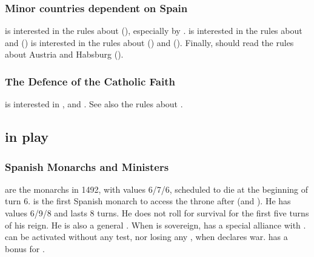 \subsubsection{Minor countries dependent on Spain}
\aparag[Knights] \SPA is interested in the rules about 
(), especially by .
 \SPA is interested in the rules about
 and  ()
\aparag[Burgundy] \SPA is interested in the rules about 
() and  ().
\aparag[Austria] Finally, \SPA should read the rules about Austria and
Habsburg ().


\subsubsection{The Defence of the Catholic Faith}
 \SPA is interested in ,  and .
\bparag See also the rules about .



\subsection{ in play}


\subsubsection{Spanish Monarchs and Ministers}
 are the monarchs in 1492,
with values 6/7/6, scheduled to die at the beginning of turn 6.
 is the first Spanish monarch to
access the throne after  (and ). He has values 6/9/8 and lasts 8 turns. He does not roll
for survival for the first five turns of his reign. He is also a general
.
\bparag When  is sovereign, \HAB has a special
alliance with \SPA. %
\HAB can be activated without any test, nor losing any \STAB, when \SPA
declares war.
\bparag \SPA has a bonus for .


